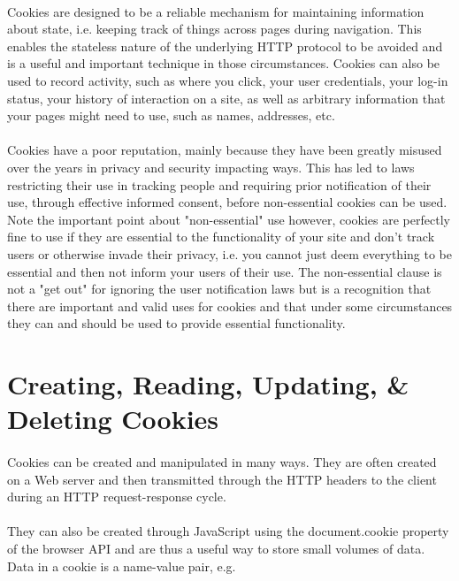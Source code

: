 \paragraph{} Cookies are designed to be a reliable mechanism for maintaining information about state, i.e. keeping track of things across pages during navigation. This enables the stateless nature of the underlying HTTP protocol to be avoided and is a useful and important technique in those circumstances. Cookies can also be used to record activity, such as where you click, your user credentials, your log-in status, your history of interaction on a site, as well as arbitrary information that your pages might need to use, such as names, addresses, etc.
\paragraph{} Cookies have a poor reputation, mainly because they have been greatly misused over the years in privacy and security impacting ways. This has led to laws restricting their use in tracking people and requiring prior notification of their use, through effective informed consent, before non-essential cookies can be used. Note the important point about "non-essential" use however, cookies are perfectly fine to use if they are essential to the functionality of your site and don't track users or otherwise invade their privacy, i.e. you cannot just deem everything to be essential and then not inform your users of their use. The non-essential clause is not a "get out" for ignoring the user notification laws but is a recognition that there are important and valid uses for cookies and that under some circumstances they can and should be used to provide essential functionality.



\section{Creating, Reading, Updating, \& Deleting Cookies}
\paragraph{} Cookies can be created and manipulated in many ways. They are often created on a Web server and then transmitted through the HTTP headers to the client during an HTTP request-response cycle.
\paragraph{} They can also be created through JavaScript using the document.cookie property of the browser API and are thus a useful way to store small volumes of data. Data in a cookie is a name-value pair, e.g.

